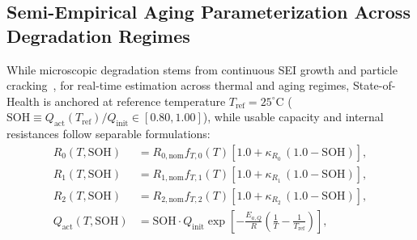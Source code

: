 \documentclass[balance,nocopyright,upint,varvw,hyphenate,barcolor=NavyBlue,nolists]{asmejour}
\begin{document}
\subsection{Semi-Empirical Aging Parameterization Across Degradation Regimes}
While microscopic degradation stems from continuous SEI growth and particle cracking~\cite{Birkl2017diagnostics,Ren2019aging}, for real-time estimation across thermal and aging regimes, State-of-Health is anchored at reference temperature $T_{\text{ref}} = 25^\circ\text{C}$ ($\text{SOH} \equiv Q_{\text{act}}(T_{\text{ref}})/Q_{\text{init}} \in [0.80, 1.00]$), while usable capacity and internal resistances follow separable formulations:
\begin{align}
R_0(T, \text{SOH}) &= R_{0,\text{nom}} f_{T,0}(T) [1.0 + \kappa_{R_0}\,(1.0 - \text{SOH})], \label{eqn:aging_r0}\\
R_1(T, \text{SOH}) &= R_{1,\text{nom}} f_{T,1}(T) [1.0 + \kappa_{R_1}\,(1.0 - \text{SOH})], \label{eqn:aging_r1}\\
R_2(T, \text{SOH}) &= R_{2,\text{nom}} f_{T,2}(T) [1.0 + \kappa_{R_2}\,(1.0 - \text{SOH})], \label{eqn:aging_r2}\\
Q_{\text{act}}(T, \text{SOH}) &= \text{SOH} \cdot Q_{\text{init}} \exp\left[-\frac{E_{a,Q}}{R}\left(\frac{1}{T} - \frac{1}{T_{\text{ref}}}\right)\right], \label{eqn:aging_q}
\end{align}
\end{document}
